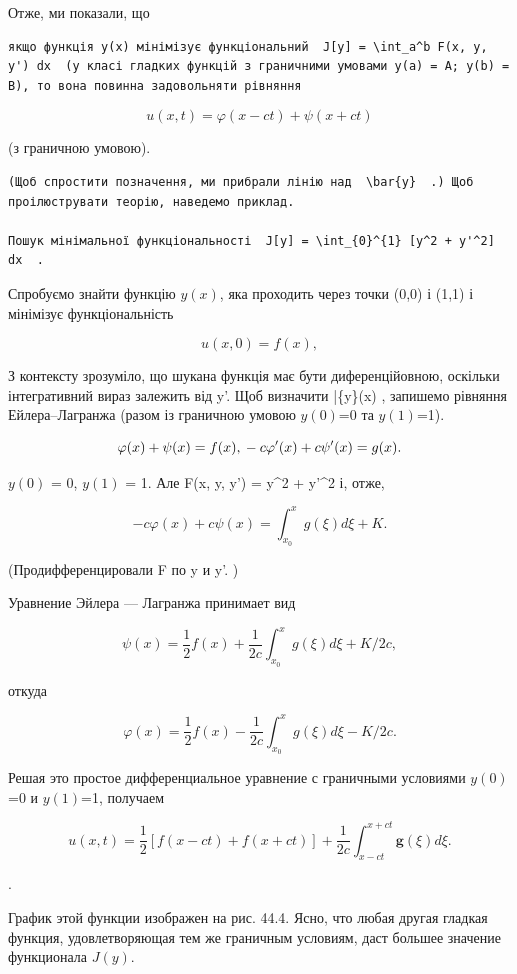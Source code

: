 \documentclass[
  ukrainian,
]{article}
\begin{document}
Отже, ми показали, що

\begin{verbatim}
якщо функція y(x) мінімізує функціональний  J[y] = \int_a^b F(x, y, y') dx  (у класі гладких функцій з граничними умовами y(a) = A; y(b) = B), то вона повинна задовольняти рівняння
\end{verbatim}

\[
u(x, t) = \varphi(x - ct) + \psi(x + ct)
\]

(з граничною умовою).

\begin{verbatim}
(Щоб спростити позначення, ми прибрали лінію над  \bar{y}  .) Щоб проілюструвати теорію, наведемо приклад.

Пошук мінімальної функціональності  J[y] = \int_{0}^{1} [y^2 + y'^2] dx  .
\end{verbatim}

Спробуємо знайти функцію \(y(x)\), яка проходить через точки (0,0) і
(1,1) і мінімізує функціональність

\[
u(x, 0) = f(x),
\]

З контексту зрозуміло, що шукана функція має бути диференційовною,
оскільки інтегративний вираз залежить від y'. Щоб визначити \bar\{y\}(x)
, запишемо рівняння Ейлера--Лагранжа (разом із граничною умовою
\(y(0)\)=0 та \(y(1)\)=1).

\[
\varphi(x) + \psi(x) = f(x), \\ -c\varphi'(x) + c\psi'(x) = g(x).
\]

\(y(0)\) = 0, \(y(1)\) = 1. Але F(x, y, y') = y\^{}2 + y'\^{}2 і, отже,

\[
-c\varphi(x) + c\psi(x) = \int_{x_0}^{x} g(\xi) d\xi + K.
\]

(Продифференцировали F по y и y'. )

Уравнение Эйлера --- Лагранжа принимает вид

\[
\psi(x) = \frac{1}{2} f(x) + \frac{1}{2c} \int_{x_0}^{x} g(\xi) d\xi + K/2c,
\]

откуда

\[
\varphi(x) = \frac{1}{2} f(x) - \frac{1}{2c} \int_{x_0}^{x} g(\xi) d\xi - K/2c.
\]

Решая это простое дифференциальное уравнение с граничными условиями
\(y(0)\)=0 и \(y(1)\)=1, получаем

\[
u(x, t) = \frac{1}{2} \left[ f(x-ct) + f(x+ct) \right] + \frac{1}{2c} \int_{x-ct}^{x+ct} \mathbf{g}(\xi) d\xi.
\]

.

График этой функции изображен на рис. 44.4. Ясно, что любая другая
гладкая функция, удовлетворяющая тем же граничным условиям, даст большее
значение функционала \(J(y)\).
\end{document}
